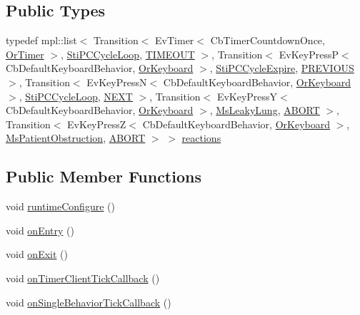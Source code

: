 \subsection*{Public Types}
\begin{DoxyCompactItemize}
\item 
typedef mpl\+::list$<$ Transition$<$ Ev\+Timer$<$ Cb\+Timer\+Countdown\+Once, \hyperlink{classsm__respira__1_1_1OrTimer}{Or\+Timer} $>$, \hyperlink{structsm__respira__1_1_1pc__cycle__inner__states_1_1StiPCCycleLoop}{Sti\+P\+C\+Cycle\+Loop}, \hyperlink{structsm__respira__1_1_1pc__cycle__inner__states_1_1StiPCCycleDwell_1_1TIMEOUT}{T\+I\+M\+E\+O\+UT} $>$, Transition$<$ Ev\+Key\+PressP$<$ Cb\+Default\+Keyboard\+Behavior, \hyperlink{classsm__respira__1_1_1OrKeyboard}{Or\+Keyboard} $>$, \hyperlink{structsm__respira__1_1_1pc__cycle__inner__states_1_1StiPCCycleExpire}{Sti\+P\+C\+Cycle\+Expire}, \hyperlink{structsm__respira__1_1_1pc__cycle__inner__states_1_1StiPCCycleDwell_1_1PREVIOUS}{P\+R\+E\+V\+I\+O\+US} $>$, Transition$<$ Ev\+Key\+PressN$<$ Cb\+Default\+Keyboard\+Behavior, \hyperlink{classsm__respira__1_1_1OrKeyboard}{Or\+Keyboard} $>$, \hyperlink{structsm__respira__1_1_1pc__cycle__inner__states_1_1StiPCCycleLoop}{Sti\+P\+C\+Cycle\+Loop}, \hyperlink{structsm__respira__1_1_1pc__cycle__inner__states_1_1StiPCCycleDwell_1_1NEXT}{N\+E\+XT} $>$, Transition$<$ Ev\+Key\+PressY$<$ Cb\+Default\+Keyboard\+Behavior, \hyperlink{classsm__respira__1_1_1OrKeyboard}{Or\+Keyboard} $>$, \hyperlink{classsm__respira__1_1_1MsLeakyLung}{Ms\+Leaky\+Lung}, \hyperlink{classABORT}{A\+B\+O\+RT} $>$, Transition$<$ Ev\+Key\+PressZ$<$ Cb\+Default\+Keyboard\+Behavior, \hyperlink{classsm__respira__1_1_1OrKeyboard}{Or\+Keyboard} $>$, \hyperlink{classsm__respira__1_1_1MsPatientObstruction}{Ms\+Patient\+Obstruction}, \hyperlink{classABORT}{A\+B\+O\+RT} $>$ $>$ \hyperlink{structsm__respira__1_1_1pc__cycle__inner__states_1_1StiPCCycleDwell_a70560279c411fb3963a3320257f938b5}{reactions}
\end{DoxyCompactItemize}
\subsection*{Public Member Functions}
\begin{DoxyCompactItemize}
\item 
void \hyperlink{structsm__respira__1_1_1pc__cycle__inner__states_1_1StiPCCycleDwell_a2523862e7ca0fcc8886879dcaf4fd6d2}{runtime\+Configure} ()
\item 
void \hyperlink{structsm__respira__1_1_1pc__cycle__inner__states_1_1StiPCCycleDwell_ab1dc1de7d115a5d9989f7d18bc85662e}{on\+Entry} ()
\item 
void \hyperlink{structsm__respira__1_1_1pc__cycle__inner__states_1_1StiPCCycleDwell_a6ba02bfd9ecc62b824b86e83820dae6b}{on\+Exit} ()
\item 
void \hyperlink{structsm__respira__1_1_1pc__cycle__inner__states_1_1StiPCCycleDwell_aaa9be342bc58926f91230ab15e4925cc}{on\+Timer\+Client\+Tick\+Callback} ()
\item 
void \hyperlink{structsm__respira__1_1_1pc__cycle__inner__states_1_1StiPCCycleDwell_a39d69f67f8b5649295ad6a66cc9c0cf8}{on\+Single\+Behavior\+Tick\+Callback} ()
\end{DoxyCompactItemize}
